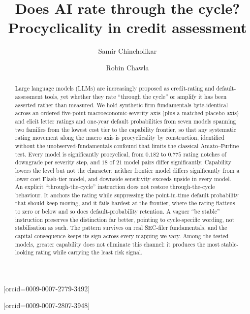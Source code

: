 \documentclass[a4paper,fleqn]{cas-sc}
\begin{document}
\let\WriteBookmarks\relax
\def\floatpagepagefraction{1}
\def\textpagefraction{.001}


\title[mode=title]{Does AI rate through the cycle? Procyclicality in credit assessment}

\author[1]{Samir Chincholikar}[orcid=0009-0007-2779-3492]

\author[2]{Robin Chawla}[orcid=0009-0007-2807-3948]
\cormark[1]


\begin{abstract}
Large language models (LLMs) are increasingly proposed as credit-rating and default-assessment
tools, yet whether they rate ``through the cycle'' or amplify it has been asserted rather than
measured. We hold
synthetic firm fundamentals byte-identical across an ordered five-point macroeconomic-severity axis
(plus a matched placebo axis) and elicit letter ratings and one-year default
probabilities from seven models spanning two families from the lowest cost tier to the capability
frontier, so that any systematic rating movement along the macro axis is procyclicality by construction, identified without the
unobserved-fundamentals confound that limits the classical Amato--Furfine test. Every model is
significantly procyclical, from $0.182$ to $0.775$ rating notches of downgrade per severity step, and
$18$ of $21$ model pairs differ significantly. Capability lowers the level but not the character: neither
frontier model differs significantly from a lower cost Flash-tier model, and downside
sensitivity exceeds upside in every model. An explicit ``through-the-cycle'' instruction
does not restore through-the-cycle behaviour. It anchors the rating while suppressing the
point-in-time default probability that should keep moving, and it fails hardest at the frontier, where
the rating flattens to zero or below and so does default-probability retention. A vaguer
``be stable'' instruction preserves the distinction far better, pointing to cycle-specific wording, not
stabilisation as such. The pattern survives on real SEC-filer fundamentals, and the
capital consequence keeps its sign across every mapping we vary. Among the tested models,
greater capability does not eliminate this channel: it produces the most stable-looking rating while carrying
the least risk signal.
\end{abstract}
\end{document}
